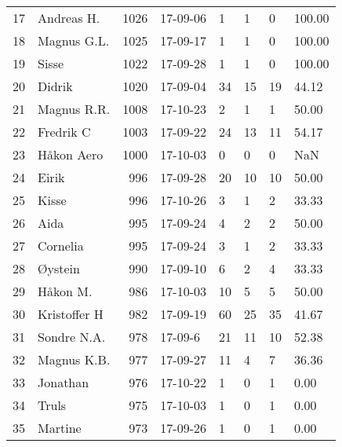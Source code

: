 \begin{longtable}{|r|l|r|l|l|l|l|l|}
17 &           Andreas H. &  1026 &    17-09-06 &               1 &     1 &       0 &    100.00 \\
18 &          Magnus G.L. &  1025 &    17-09-17 &               1 &     1 &       0 &    100.00 \\
19 &                Sisse &  1022 &    17-09-28 &               1 &     1 &       0 &    100.00 \\
20 &               Didrik &  1020 &    17-09-04 &              34 &    15 &      19 &     44.12 \\
21 &          Magnus R.R. &  1008 &    17-10-23 &               2 &     1 &       1 &     50.00 \\
22 &            Fredrik C &  1003 &    17-09-22 &              24 &    13 &      11 &     54.17 \\
23 &           Håkon Aero &  1000 &    17-10-03 &               0 &     0 &       0 &       NaN \\
24 &                Eirik &   996 &    17-09-28 &              20 &    10 &      10 &     50.00 \\
25 &                Kisse &   996 &    17-10-26 &               3 &     1 &       2 &     33.33 \\
26 &                 Aida &   995 &    17-09-24 &               4 &     2 &       2 &     50.00 \\
27 &             Cornelia &   995 &    17-09-24 &               3 &     1 &       2 &     33.33 \\
28 &              Øystein &   990 &    17-09-10 &               6 &     2 &       4 &     33.33 \\
29 &             Håkon M. &   986 &    17-10-03 &              10 &     5 &       5 &     50.00 \\
30 &         Kristoffer H &   982 &    17-09-19 &              60 &    25 &      35 &     41.67 \\
31 &          Sondre N.A. &   978 &     17-09-6 &              21 &    11 &      10 &     52.38 \\
32 &          Magnus K.B. &   977 &    17-09-27 &              11 &     4 &       7 &     36.36 \\
33 &             Jonathan &   976 &    17-10-22 &               1 &     0 &       1 &      0.00 \\
34 &                Truls &   975 &    17-10-03 &               1 &     0 &       1 &      0.00 \\
35 &              Martine &   973 &    17-09-26 &               1 &     0 &       1 &      0.00 \\

\end{longtable}
